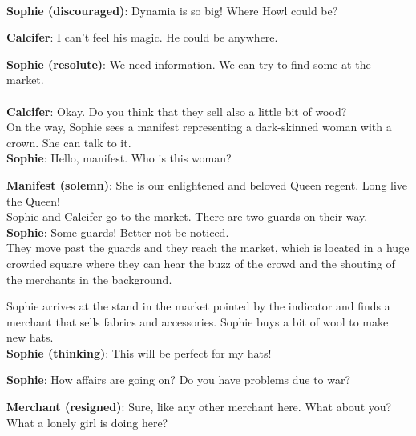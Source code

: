 \noindent \\

\textbf{Sophie (discouraged)}: Dynamia is so big! Where Howl could be?

\textbf{Calcifer}: I can’t feel his magic. He could be anywhere.

\textbf{Sophie (resolute)}: We need information. We can try to find some at the market. \\

\\

\textbf{Calcifer}: Okay. Do you think that they sell also a little bit of wood?\\

\noindent On the way, Sophie sees a manifest representing a dark-skinned woman with a crown. She can talk to it.\\

\textbf{Sophie}: Hello, manifest. Who is this woman?

\textbf{Manifest (solemn)}: She is our enlightened and beloved Queen regent. Long live the Queen!\\

\noindent Sophie and Calcifer go to the market. There are two guards on their way.\\

\textbf{Sophie}: Some guards! Better not be noticed.\\

\noindent They move past the guards and they reach the market, which is located in a huge crowded square where they can hear the buzz of the crowd and the shouting of the merchants in the background.


\noindent Sophie arrives at the stand in the market pointed by the indicator and finds a merchant that sells fabrics and accessories.
Sophie buys a bit of wool to make new hats.\\

\textbf{Sophie (thinking)}: This will be perfect for my hats!

\textbf{Sophie}: How affairs are going on? Do you have problems due to war?

\textbf{Merchant (resigned)}: Sure, like any other merchant here. What about you? What a lonely girl is doing here?\\

